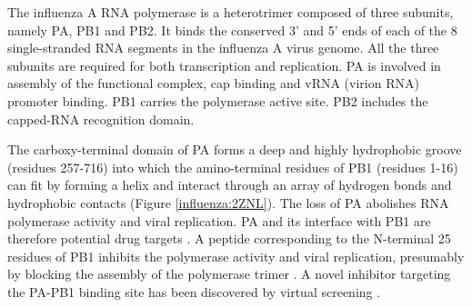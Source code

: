 
The influenza A RNA polymerase is a heterotrimer composed of three subunits, namely PA, PB1 and PB2. It binds the conserved 3' and 5' ends of each of the 8 single-stranded RNA segments in the influenza A virus genome. All the three subunits are required for both transcription and replication. PA is involved in assembly of the functional complex, cap binding and vRNA (virion RNA) promoter binding. PB1 carries the polymerase active site. PB2 includes the capped-RNA recognition domain.

The carboxy-terminal domain of PA forms a deep and highly hydrophobic groove (residues 257-716) into which the amino-terminal residues of PB1 (residues 1-16) can fit by forming a helix and interact through an array of hydrogen bonds and hydrophobic contacts \citep{1141} (Figure \ref{influenza:2ZNL}). The loss of PA abolishes RNA polymerase activity and viral replication. PA and its interface with PB1 are therefore potential drug targets \citep{1141}. A peptide corresponding to the N-terminal 25 residues of PB1 inhibits the polymerase activity and viral replication, presumably by blocking the assembly of the polymerase trimer \citep{1234}. A novel inhibitor targeting the PA-PB1 binding site has been discovered by virtual screening \citep{1235}.


